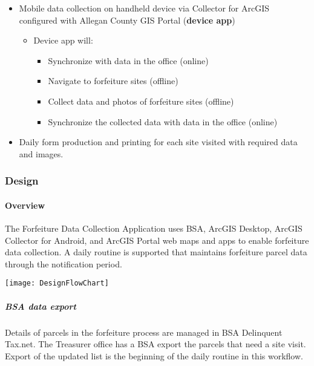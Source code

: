 \documentclass[class=article , crop=false, titlepage, twoside, multi={itemize, figure, verbatim}, float=false]{standalone}
\begin{document}
\begin{itemize} %

\item Mobile data collection on handheld device via Collector for ArcGIS configured with Allegan County GIS Portal  (\textbf{device app})

\begin{itemize} %

\item Device app will:

\begin{itemize} %

\item Synchronize with data in the office (online)
\item Navigate to forfeiture sites (offline)
\item Collect data and photos of forfeiture sites (offline)
\item Synchronize the collected data with data in the office (online)
\end{itemize} %

\end{itemize} %

\item Daily form production and printing for each site visited with required data and images.

\end{itemize} %

\clearpage
\subsubsection{Design}

\paragraph{Overview}The Forfeiture Data Collection Application uses BSA, ArcGIS Desktop, ArcGIS Collector for Android, and ArcGIS Portal web maps and apps to enable forfeiture data collection.  A daily routine is supported that maintains forfeiture parcel data through the notification period.
\begin{center}
    \texttt{[image: DesignFlowChart]}
    \label{img:dflow1}
\end{center}


\subparagraph{BSA data export}Details of parcels in the forfeiture process are managed in BSA Delinquent Tax.net.  The Treasurer office has a BSA export the parcels that need a site visit.  Export of the updated list is the beginning of the daily routine in this workflow.
\end{document}
